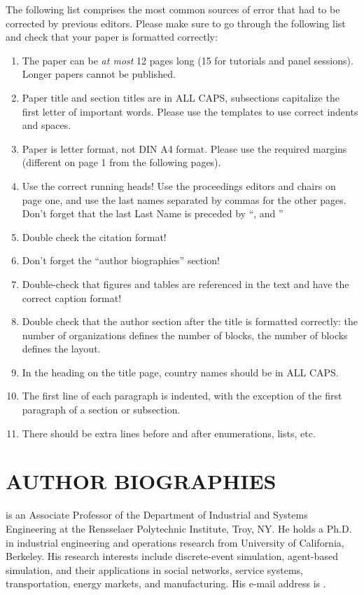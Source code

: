 \documentclass{wscpaperproc}
\theoremstyle{wsc}
\begin{document}
The following list comprises the most common sources of error that had to be corrected by previous editors. Please make sure to go through the following list and check that your paper is formatted correctly:

\begin{enumerate}
\item   The paper can be \textit{at most} 12 pages long (15 for tutorials and panel sessions). Longer papers cannot be published.
\item	Paper title and section titles are in ALL CAPS, subsections capitalize the first letter of important words. Please use the templates to use correct indents and spaces.
\item	Paper is letter format, not DIN A4 format. Please use the required margins (different on page 1 from the following pages).
\item	Use the correct running heads! Use the proceedings editors and chairs on page one, and use the last names separated by commas for the other pages. Don't forget that the last Last Name is preceded by ``, and ''
\item	Double check the citation format!
\item	Don't forget the ``author biographies'' section!
\item	Double-check that figures and tables are referenced in the text and have the correct caption format!
\item	Double check that the author section after the title is formatted correctly: the number of organizations defines the number of blocks, the number of blocks defines the layout.
\item	In the heading on the title page, country names should be in ALL CAPS.
\item	The first line of each paragraph is indented, with the exception of the first paragraph of a section or subsection.
\item	There should be extra lines before and after enumerations, lists, etc.
\end{enumerate}




\section*{AUTHOR BIOGRAPHIES}

 is an Associate Professor of the Department of Industrial and Systems Engineering at the Rensselaer Polytechnic Institute, Troy, NY. He holds a Ph.D. in industrial engineering and operations research from University of California, Berkeley. His research interests include discrete-event simulation, agent-based simulation, and their applications in social networks, service systems, transportation, energy markets, and manufacturing. His e-mail address is .\\
\end{document}
